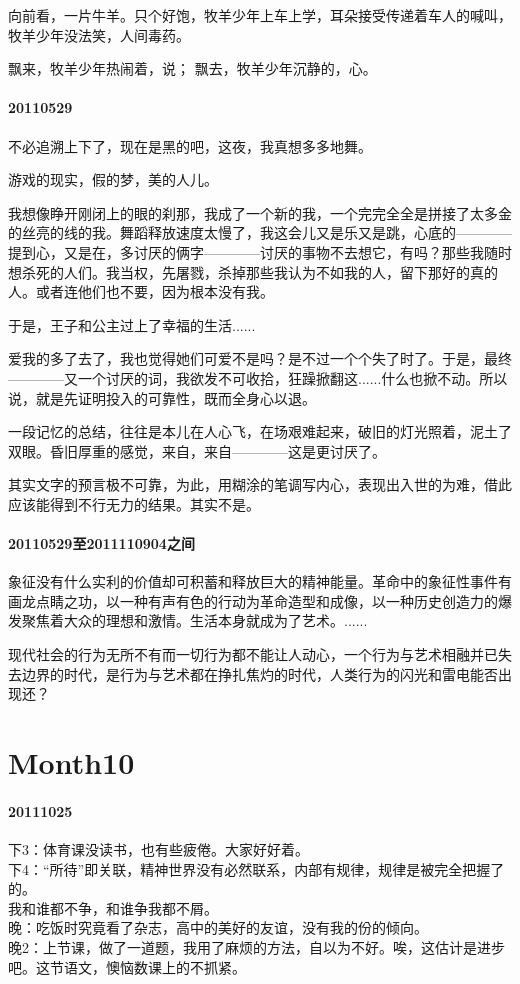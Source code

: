 \documentclass[UTF8]{book}
\begin{document}
向前看，一片牛羊。只个好饱，牧羊少年上车上学，耳朵接受传递着车人的喊叫，牧羊少年没法笑，人间毒药。

飘来，牧羊少年热闹着，说；
飘去，牧羊少年沉静的，心。


\paragraph{20110529}

不必追溯上下了，现在是黑的吧，这夜，我真想多多地舞。

游戏的现实，假的梦，美的人儿。

我想像睁开刚闭上的眼的刹那，我成了一个新的我，一个完完全全是拼接了太多金的丝亮的线的我。舞蹈释放速度太慢了，我这会儿又是乐又是跳，心底的————提到心，又是在，多讨厌的俩字————讨厌的事物不去想它，有吗？那些我随时想杀死的人们。我当权，先屠戮，杀掉那些我认为不如我的人，留下那好的真的人。或者连他们也不要，因为根本没有我。

于是，王子和公主过上了幸福的生活......

爱我的多了去了，我也觉得她们可爱不是吗？是不过一个个失了时了。于是，最终————又一个讨厌的词，我欲发不可收拾，狂躁掀翻这......什么也掀不动。所以说，就是先证明投入的可靠性，既而全身心以退。

一段记忆的总结，往往是本儿在人心飞，在场艰难起来，破旧的灯光照着，泥土了双眼。昏旧厚重的感觉，来自，来自————这是更讨厌了。

其实文字的预言极不可靠，为此，用糊涂的笔调写内心，表现出入世的为难，借此应该能得到不行无力的结果。其实不是。


\paragraph{20110529至2011110904之间}

象征没有什么实利的价值却可积蓄和释放巨大的精神能量。革命中的象征性事件有画龙点睛之功，以一种有声有色的行动为革命造型和成像，以一种历史创造力的爆发聚焦着大众的理想和激情。生活本身就成为了艺术。......

现代社会的行为无所不有而一切行为都不能让人动心，一个行为与艺术相融并已失去边界的时代，是行为与艺术都在挣扎焦灼的时代，人类行为的闪光和雷电能否出现还？


 





\section{Month10}
\paragraph{20111025}
下3：体育课没读书，也有些疲倦。大家好好着。\\
下4：“所待”即关联，精神世界没有必然联系，内部有规律，规律是被完全把握了的。\\
我和谁都不争，和谁争我都不屑。\\
晚：吃饭时究竟看了杂志，高中的美好的友谊，没有我的份的倾向。\\
晚2：上节课，做了一道题，我用了麻烦的方法，自以为不好。唉，这估计是进步吧。这节语文，懊恼数课上的不抓紧。
\end{document}
